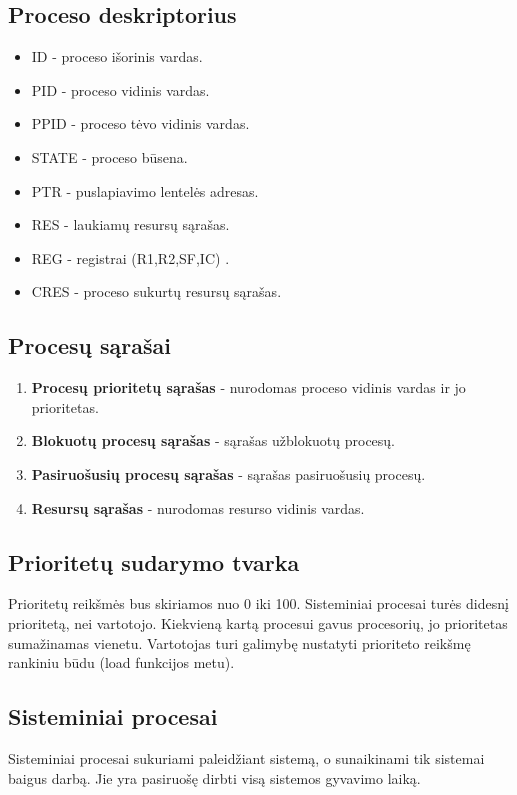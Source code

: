 	\subsection{Proceso deskriptorius}
		\begin{itemize}
			\item ID - proceso išorinis vardas.
			\item PID - proceso vidinis vardas.
			\item PPID - proceso tėvo vidinis vardas.
			\item STATE - proceso būsena.
			\item PTR - puslapiavimo lentelės adresas.
			\item RES - laukiamų resursų sąrašas.
			\item REG - registrai (R1,R2,SF,IC) .
			\item CRES - proceso sukurtų resursų sąrašas.
		\end{itemize}
	\subsection{Procesų sąrašai}
		\begin{enumerate}
			\item \textbf{Procesų prioritetų sąrašas} - nurodomas proceso vidinis vardas ir jo prioritetas.
			\item \textbf{Blokuotų procesų sąrašas} - sąrašas užblokuotų procesų.
			\item \textbf{Pasiruošusių procesų sąrašas} - sąrašas pasiruošusių procesų.
			\item  \textbf{Resursų sąrašas} - nurodomas resurso vidinis vardas.
		\end{enumerate}
	\subsection{Prioritetų sudarymo tvarka}
		Prioritetų reikšmės bus skiriamos nuo 0 iki 100. Sisteminiai procesai turės didesnį prioritetą, nei vartotojo. Kiekvieną kartą procesui gavus procesorių, jo prioritetas sumažinamas vienetu. Vartotojas turi galimybę nustatyti prioriteto reikšmę rankiniu būdu (load funkcijos metu).
	\subsection{Sisteminiai procesai}
		Sisteminiai procesai sukuriami paleidžiant sistemą, o sunaikinami tik sistemai baigus darbą. Jie yra pasiruošę dirbti visą sistemos gyvavimo laiką. 
	
